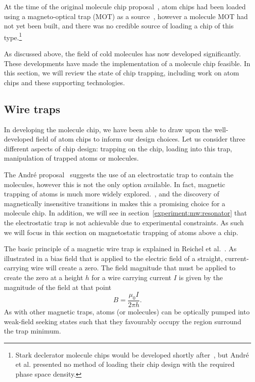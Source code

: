 
At the time of the original molecule chip proposal~\cite{Andre2006}, atom chips
had been loaded using a magneto-optical trap (MOT) as a
source~\cite{Reichel1999, Ott2001}, however a molecule MOT had not yet been
built, and there was no credible source of loading a chip of this
type.\footnote{Stark declerator molecule chips would be developed shortly
after~\cite{Meek1699}, but Andr\'e et al. presented no method of loading their
chip design with the required phase space density.}  

As discussed above, the field of cold molecules has now developed significantly.
These developments have made the implementation of a molecule chip feasible. In
this section, we will review the state of chip trapping, including work on atom
chips and these supporting technologies.

\subsection{Wire traps}

In developing the molecule chip, we have been able to draw upon the
well-developed field of atom chips to inform our design choices. Let us consider
three different aspects of chip design: trapping on the chip, loading into this
trap, manipulation of trapped atoms or molecules.

The Andr\'e proposal~\cite{Andre2006} suggests the use of an electrostatic trap
to contain the molecules, however this is not the only option available. In
fact, magnetic trapping of atoms is much more widely explored.~\cite{2011Ac},
and the discovery of magnetically insensitive transitions in \CaF makes this a
promising choice for a molecule chip. In addition, we will see in
section~\ref{experiment:mw:resonator} that the electrostatic trap is not
achievable due to experimental constraints. As such we will focus in this
section on magnetostatic trapping of atoms above a chip.

The basic principle of a magnetic wire trap is explained in Reichel et
al.~\cite{Reichel1999}. As illustrated in  a
bias field that is applied to the electric field of a straight, current-carrying
wire will create a zero. The field magnitude that must be applied to create the
zero at a height $h$ for a wire carrying current $I$ is given by the magnitude
of the field at that point~\cite{Jackson1975}
%
\begin{equation}
  B = \frac{\mu_0 I}{2\pi h}.
  \label{litrev:eqn:bias}
\end{equation}
%
As with other magnetic traps, atoms (or molecules) can be optically pumped into
weak-field seeking states such that they favourably occupy the region surround
the trap minimum.~\cite{Metcalf1999}

